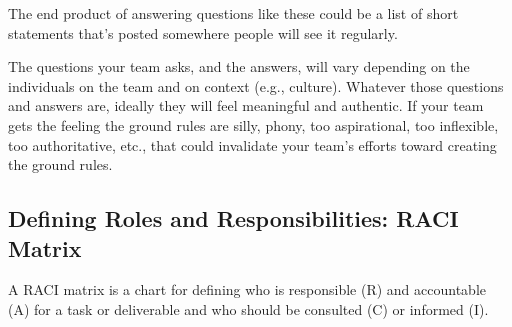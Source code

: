 \marginpar{\raciMatrixDef\margindivider}\marginpar{\mvpDef\margindivider}\marginpar{\focusGroupDef}The end product of answering questions like these could be a list of short statements that's posted somewhere people will see it regularly. 

The questions your team asks, and the answers, will vary depending on the individuals on the team and on context (e.g., culture). Whatever those questions and answers are, ideally they will feel meaningful and authentic. If your team gets the feeling the ground rules are silly, phony, too aspirational, too inflexible, too authoritative, etc., that could invalidate your team's efforts toward creating the ground rules.

\subsection{Defining Roles and Responsibilities: RACI Matrix}
A RACI matrix is a chart for defining who is responsible (R) and accountable (A) for a task or deliverable and who should be consulted (C) or informed (I). \\

